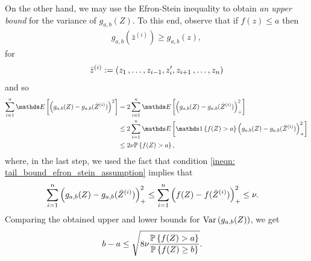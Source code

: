 \documentclass[11pt]{article}
\begin{document}
\begin{itemize}
\begin{remark}
On the other hand, we may use the Efron-Stein inequality to obtain \emph{an upper bound} for the variance of $g_{a,b}(Z)$. To this end, observe that if $f(z) \le a$ then
\begin{align*}
g_{a,b}(\bar{z}^{(i)}) \ge g_{a,b}(z),
\end{align*}  for
\begin{align*}
\bar{z}^{(i)} := (z_1 \,{,}\ldots{,}\, z_{i-1}, z_i', z_{i+1} \,{,}\ldots{,}\, z_{n}) 
\end{align*} and so
\begin{align*}
\sum_{i=1}^{n}\E{}{\paren{g_{a,b}(Z) - g_{a,b}(\bar{Z}^{(i)})}^2} &= 2 \sum_{i=1}^{n}\E{}{\paren{g_{a,b}(Z) - g_{a,b}(\bar{Z}^{(i)})}_{+}^2}\\
&\le 2 \sum_{i=1}^{n}\E{}{\ind{f(Z) > a}\paren{g_{a,b}(Z) - g_{a,b}(\bar{Z}^{(i)})}_{+}^2} \\
&\le 2 \nu \bP\set{f(Z) > a},
\end{align*} where, in the last step, we used the fact that condition \eqref{ineqn: tail_bound_efron_stein_assumption} implies that
\begin{align*}
\sum_{i=1}^{n}\left(g_{a,b}(Z) - g_{a,b}(\bar{Z}^{(i)})\right)_{+}^2 &\le \sum_{i=1}^{n}\left(f(Z) - f(\bar{Z}^{(i)})\right)_{+}^2 \le \nu.
\end{align*} Comparing the obtained upper and lower bounds for $\text{Var}\left(g_{a,b}(Z)\right)$, we get
\begin{align*}
b - a &\le \sqrt{8 \nu \frac{{\mathbb P}\left\{f(Z) > a\right\}}{{\mathbb P}\left\{f(Z) \ge b\right\}}}.
\end{align*}
\end{remark}


\end{itemize}
\end{document}
